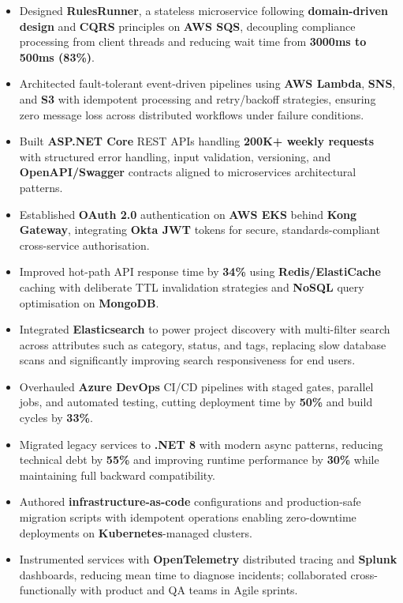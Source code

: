 \documentclass[letterpaper,10pt]{article}
\begin{document}
\begin{itemize}[leftmargin=*]
    \item Designed \textbf{RulesRunner}, a stateless microservice following \textbf{domain-driven design} and \textbf{CQRS} principles on \textbf{AWS SQS}, decoupling compliance processing from client threads and reducing wait time from \textbf{3000ms to 500ms (83\%)}.
    \item Architected fault-tolerant event-driven pipelines using \textbf{AWS Lambda}, \textbf{SNS}, and \textbf{S3} with idempotent processing and retry/backoff strategies, ensuring zero message loss across distributed workflows under failure conditions.
    \item Built \textbf{ASP.NET Core} REST APIs handling \textbf{200K+ weekly requests} with structured error handling, input validation, versioning, and \textbf{OpenAPI/Swagger} contracts aligned to microservices architectural patterns.
    \item Established \textbf{OAuth 2.0} authentication on \textbf{AWS EKS} behind \textbf{Kong Gateway}, integrating \textbf{Okta JWT} tokens for secure, standards-compliant cross-service authorisation.
    \item Improved hot-path API response time by \textbf{34\%} using \textbf{Redis/ElastiCache} caching with deliberate TTL invalidation strategies and \textbf{NoSQL} query optimisation on \textbf{MongoDB}.
    \item Integrated \textbf{Elasticsearch} to power project discovery with multi-filter search across attributes such as category, status, and tags, replacing slow database scans and significantly improving search responsiveness for end users.
    \item Overhauled \textbf{Azure DevOps} CI/CD pipelines with staged gates, parallel jobs, and automated testing, cutting deployment time by \textbf{50\%} and build cycles by \textbf{33\%}.
    \item Migrated legacy services to \textbf{.NET 8} with modern async patterns, reducing technical debt by \textbf{55\%} and improving runtime performance by \textbf{30\%} while maintaining full backward compatibility.
    \item Authored \textbf{infrastructure-as-code} configurations and production-safe migration scripts with idempotent operations enabling zero-downtime deployments on \textbf{Kubernetes}-managed clusters.
    \item Instrumented services with \textbf{OpenTelemetry} distributed tracing and \textbf{Splunk} dashboards, reducing mean time to diagnose incidents; collaborated cross-functionally with product and QA teams in Agile sprints.
\end{itemize}
\end{document}
